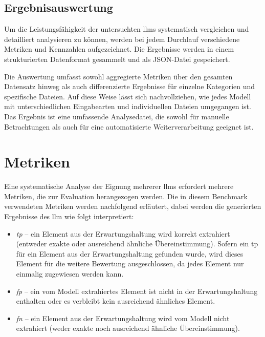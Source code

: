 
\subsection{Ergebnisauswertung}\label{subsec:ergebnisauswertung}

Um die Leistungsfähigkeit der untersuchten \glspl{llm} systematisch vergleichen und detailliert analysieren zu können, werden bei jedem Durchlauf verschiedene Metriken und Kennzahlen aufgezeichnet.
Die Ergebnisse werden in einem strukturierten Datenformat gesammelt und als JSON-Datei gespeichert.

Die Auswertung umfasst sowohl aggregierte Metriken über den gesamten Datensatz hinweg als auch differenzierte Ergebnisse für einzelne Kategorien und spezifische Dateien.
Auf diese Weise lässt sich nachvollziehen, wie jedes Modell mit unterschiedlichen Eingabearten und individuellen Dateien umgegangen ist.
Das Ergebnis ist eine umfassende Analysedatei, die sowohl für manuelle Betrachtungen als auch für eine automatisierte Weiterverarbeitung geeignet ist.


\section{Metriken}\label{sec:metriken-benchmark}

Eine systematische Analyse der Eignung mehrerer \glspl{llm} erfordert mehrere Metriken, die zur Evaluation herangezogen werden.
Die in diesem Benchmark verwendeten Metriken werden nachfolgend erläutert, dabei werden die generierten Ergebnisse des \gls{llm} wie folgt interpretiert:
\begin{itemize}
    \item \textit{\gls{tp}} -- ein Element aus der Erwartungshaltung wird korrekt extrahiert (entweder exakte oder ausreichend ähnliche Übereinstimmung). Sofern ein \gls{tp} für ein Element aus der Erwartungshaltung gefunden wurde, wird dieses Element für die weitere Bewertung ausgeschlossen, da jedes Element nur einmalig zugewiesen werden kann.
    \item \textit{\gls{fp}} -- ein vom Modell extrahiertes Element ist nicht in der Erwartungshaltung enthalten oder es verbleibt kein ausreichend ähnliches Element.
    \item \textit{\gls{fn}} -- ein Element aus der Erwartungshaltung wird vom Modell nicht extrahiert (weder exakte noch ausreichend ähnliche Übereinstimmung).
\end{itemize}

